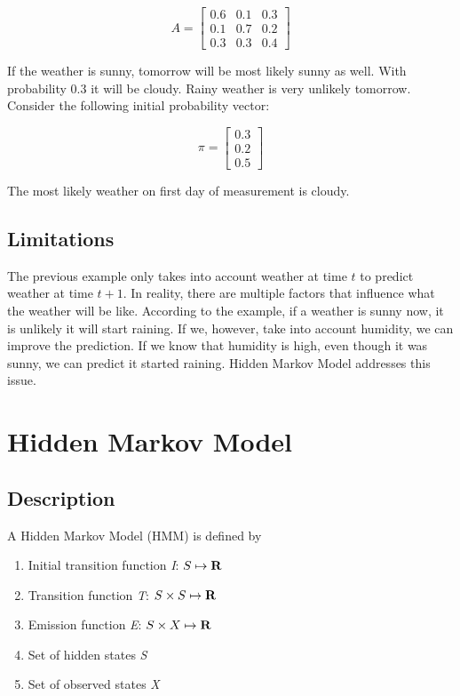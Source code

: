 \documentclass[thesis=B,english]{FITthesis}[2012/06/26]
\begin{document}
\begin{equation}
A =
\begin{bmatrix}
	0.6	& 0.1 & 0.3 \\
	0.1 & 0.7 & 0.2 \\
	0.3 & 0.3 & 0.4
\end{bmatrix}
\end{equation}

If the weather is sunny, tomorrow will be most likely sunny as well. With probability 0.3 it will be cloudy. Rainy weather is very unlikely tomorrow. Consider the following initial probability vector:

\begin{equation}
\pi = \begin{bmatrix} 0.3 \\ 0.2 \\ 0.5 \end{bmatrix}
\end{equation}

The most likely weather on first day of measurement is cloudy.

\subsection{Limitations}

The previous example only takes into account weather at time $t$ to predict weather at time $t+1$. In reality, there are multiple factors that influence what the weather will be like. According to the example, if a weather is sunny now, it is unlikely it will start raining. If we, however, take into account humidity, we can improve the prediction. If we know that humidity is high, even though it was sunny, we can predict it started raining. Hidden Markov Model addresses this issue.

\section{Hidden Markov Model}

\subsection{Description}

A Hidden Markov Model (HMM) is defined by
\begin{enumerate}

\item Initial transition function \emph{I}: $S \mapsto \textbf R$
\item Transition function \emph{T}: $S \times S \mapsto \textbf R$ 
\item Emission function \emph{E}: $S \times X \mapsto \textbf R$
\item Set of hidden states \emph{S}
\item Set of observed states \emph{X}

\end{enumerate}
\end{document}

